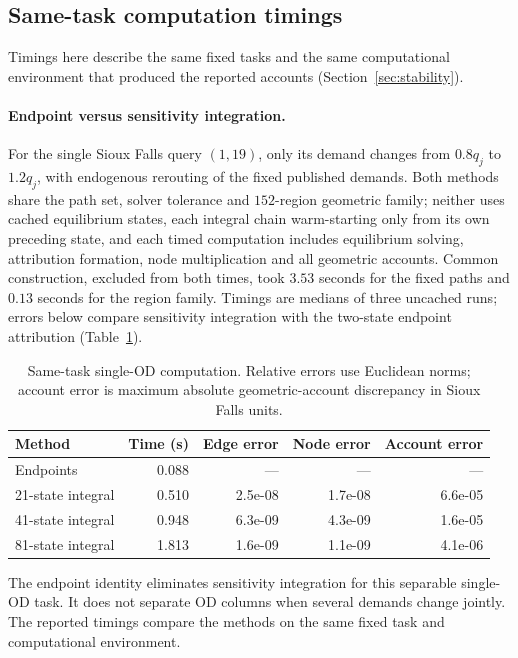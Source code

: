 \subsection{Same-task computation timings}\label{supp:timing}
Timings here describe the same fixed tasks and the same computational
environment that produced the reported accounts
(Section~\ref{sec:stability}).

\paragraph{Endpoint versus sensitivity integration.}
For the single Sioux Falls query $(1,19)$, only its demand changes from
$0.8q_j$ to $1.2q_j$, with endogenous rerouting of the fixed published
demands. Both methods share the path set, solver tolerance and
$152$-region geometric family; neither uses cached equilibrium states,
each integral chain warm-starting only from its own preceding state,
and each timed computation includes equilibrium solving, attribution
formation, node multiplication and all geometric accounts. Common
construction, excluded from both times, took $3.53$ seconds for the
fixed paths and $0.13$ seconds for the region family. Timings are
medians of three uncached runs; errors below compare sensitivity
integration with the two-state endpoint attribution
(Table~\ref{tab:endpointbenchmark}).
\begin{table}[pos=t]\centering\footnotesize\caption{Same-task single-OD computation. Relative errors use Euclidean norms; account error is maximum absolute geometric-account discrepancy in Sioux Falls units.}\label{tab:endpointbenchmark}\begin{tabular}{lrrrr}\toprule Method & Time (s) & Edge error & Node error & Account error\\\midrule
Endpoints & 0.088 & --- & --- & ---\\
21-state integral & 0.510 & 2.5e-08 & 1.7e-08 & 6.6e-05\\
41-state integral & 0.948 & 6.3e-09 & 4.3e-09 & 1.6e-05\\
81-state integral & 1.813 & 1.6e-09 & 1.1e-09 & 4.1e-06\\
\bottomrule\end{tabular}\end{table}
The endpoint identity eliminates sensitivity integration for this
separable single-OD task. It does not separate OD columns when several
demands change jointly. The reported timings compare the methods on the
same fixed task and computational environment.

